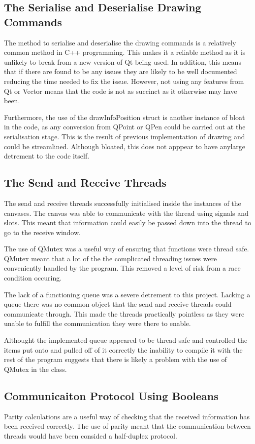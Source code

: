 \documentclass[10pt]{article}
\begin{document}
\begin{multicols*}{2}
\subsection{The Serialise and Deserialise Drawing Commands}
The method to serialise and deserialise the drawing commands is a relatively common method in C++ programming. This makes it a reliable method as it is unlikely to break from a new version of Qt being used. In addition, this means that if there are found to be any issues they are likely to be well documented reducing the time needed to fix the issue. However, not using any features from Qt or Vector means that the code is not as succinct as it otherwise may have been.

Furthermore, the use of the drawInfoPosition struct is another instance of bloat in the code, as any conversion from QPoint or QPen could be carried out at the serialisation stage. This is the result of previous implementation of drawing and could be streamlined. Although bloated, this does not apppear to have anylarge detrement to the code itself.

\subsection{The Send and Receive Threads}
The send and receive threads successfully initialised inside the instances of the canvases. The canvas was able to communicate with the thread using signals and slots. This meant that information could easily be passed down into the thread to go to the receive window.

The use of QMutex was a useful way of ensuring that functions were thread safe. QMutex meant that a lot of the the complicated threading issues were conveniently handled by the program. This removed a level of risk from a race condition occuring.

The lack of a functioning queue was a severe detrement to this project. Lacking a queue there was no common object that the send and receive threads could communicate through. This made the threads practically pointless as they were unable to fulfill the communication they were there to enable.

Althought the implemented queue appeared to be thread safe and controlled the items put onto and pulled off of it correctly the inability to compile it with the rest of the program suggests that there is likely a problem with the use of QMutex in the class.

\subsection{Communicaiton Protocol Using Booleans}
Parity calculations are a useful way of checking that the received information has been received correctly. The use of parity meant that the communication between threads would have been consided a half-duplex protocol.


\end{multicols*}
\end{document}
